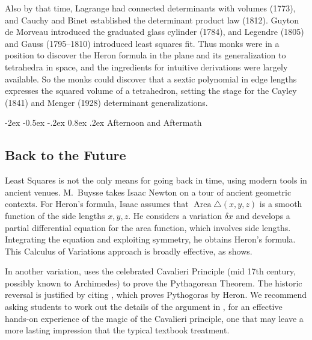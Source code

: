 \documentclass[10.5pt]
{amsart}
\makeatletter
\renewcommand{\section}{\@startsection{section}{1}{\z@}%
  {-2ex \@plus -0.5ex \@minus -.2ex}%
  {0.8ex \@plus .2ex}%
  {\normalfont\Large\bfseries}}
\makeatother
\begin{document}
Also by that time, Lagrange had connected determinants with volumes (1773), and Cauchy and Binet established the determinant product law (1812). Guyton de Morveau introduced the graduated glass cylinder (1784), and Legendre (1805) and Gauss (1795--1810) introduced least squares fit. Thus monks were in a position to discover the Heron formula in the plane and its generalization to tetrahedra in space, and the ingredients for intuitive derivations \cite{klain-2004} were largely available. So the monks could discover that a sextic polynomial in edge lengths expresses the squared volume  of a tetrahedron, setting the stage for the Cayley (1841) and Menger (1928) determinant generalizations.

\section{Afternoon and Aftermath}

\subsection{Back to the Future}
Least Squares is not the only means for going back in time, using modern tools in ancient venues. M.~Buysse \cite{buysse-2023} takes Isaac Newton on a tour of ancient geometric contexts. For Heron's formula, Isaac assumes that $\operatorname{Area}\triangle(x,y,z)$ is a smooth function of the side lengths $x,y,z$. He considers a variation $\delta x$ and develops a partial differential equation for the area function, which involves side lengths. Integrating the equation and exploiting symmetry, he obtains Heron's formula. This Calculus of Variations approach is broadly effective, as \cite{buysse-2023} shows.

In another variation, \cite{pythagoras_via_cavalieri-2015} uses the celebrated Cavalieri Principle (mid 17th century, possibly known to Archimedes) to prove the Pythagorean Theorem. The historic reversal is justified by citing \cite{pythagoras_by_heron-2010}, which proves Pythogoras by Heron. We recommend asking students to work out the details of the argument in \cite{pythagoras_via_cavalieri-2015}, for an effective hands-on experience of the magic of the Cavalieri principle, one that may leave a more lasting impression that the typical textbook treatment.
\end{document}
